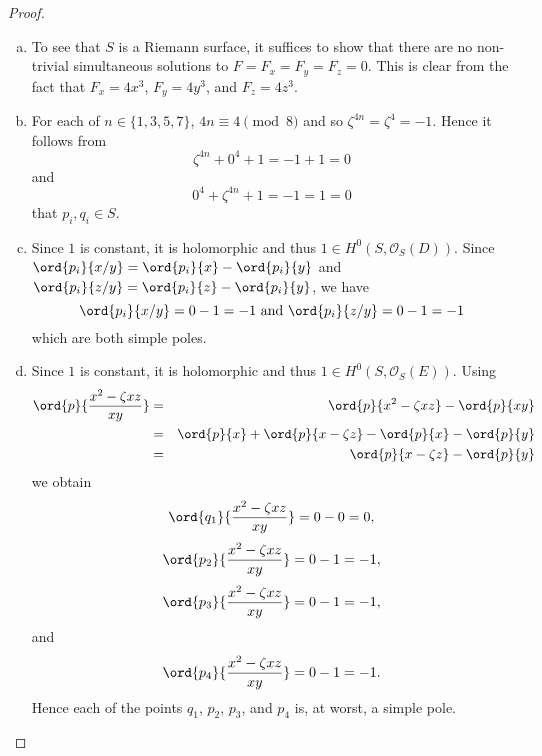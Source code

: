 \documentclass[10pt]{amsart}
\begin{document}
\begin{thm}
  \begin{proof}
    \begin{enumerate}[(a)]
    \item
      To see that $S$ is a Riemann surface, it suffices to show that there are no non-trivial simultaneous solutions to $F = F_x = F_y = F_z = 0$.
      This is clear from the fact that $F_x = 4x^3$, $F_y = 4y^3$, and $F_z = 4z^3$.
    \item
      For each of $n \in \{1,3,5,7\}$, $4n \equiv 4 \pmod{8}$ and so $\zeta^{4n} = \zeta^4 = -1$.
      Hence it follows from 
      $$\zeta^{4n} + 0^4 + 1 = -1 + 1 = 0$$
      and
      $$0^4 + \zeta^{4n} + 1 = -1 = 1 = 0$$
      that $p_i, q_i \in S$.
    \item
      Since $1$ is constant, it is holomorphic and thus $1 \in H^0\left(S, \mathcal{O}_S(D)\right)$.
      Since $\ord{p_i}{x/y} = \ord{p_i}{x} - \ord{p_i}{y}$ and $\ord{p_i}{z/y} = \ord{p_i}{z} - \ord{p_i}{y}$, we have
      $$\ord{p_i}{x/y} = 0 - 1 = -1\ \text{and}\ \ord{p_i}{z/y} = 0 - 1 = -1$$
      which are both simple poles.
    \item
      Since $1$ is constant, it is holomorphic and thus $1 \in H^0\left(S, \mathcal{O}_S(E)\right)$.
      Using
      \begin{eqnarray*}
        \ord{p}{\frac{x^2 - \zeta x z}{xy}} &=& \ord{p}{x^2 - \zeta x z} - \ord{p}{xy}\\
        &=& \ord{p}{x} + \ord{p}{x - \zeta z} - \ord{p}{x} - \ord{p}{y}\\
        &=&  \ord{p}{x - \zeta z} - \ord{p}{y}
      \end{eqnarray*}
      we obtain
      $$\ord{q_1}{\frac{x^2 - \zeta x z}{xy}} = 0 - 0 = 0,$$
      $$\ord{p_2}{\frac{x^2 - \zeta x z}{xy}} = 0 - 1 = -1,$$
      $$\ord{p_3}{\frac{x^2 - \zeta x z}{xy}} = 0 - 1 = -1,$$ and
      $$\ord{p_4}{\frac{x^2 - \zeta x z}{xy}} = 0 - 1 = -1.$$
      Hence each of the points $q_1$, $p_2$, $p_3$, and $p_4$ is, at worst, a simple pole.
    \end{enumerate}
  \end{proof}
\end{thm}
\end{document}
